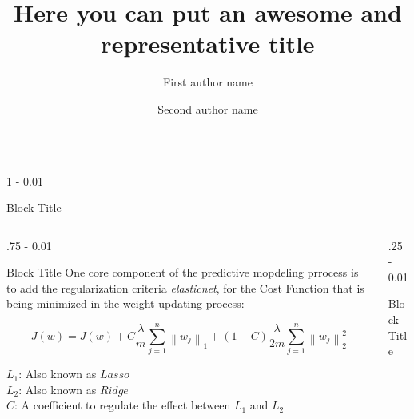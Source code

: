 \documentclass{postertheme}\usepackage[]{graphicx}\usepackage[]{color}
\title{Here you can put an awesome and representative title}
\author {
  First author name \inst{1}
  \and
  Second author name \inst{2}
  }
\institute {
  \inst{1} Academic institute
  \and
  \inst{2} Industry research center
  }
\begin{document}
\begin{frame}


\begin{columns}[onlytextwidth]
  
  \begin{column}{1 \textwidth - 0.01 \textwidth}
    \begin{block}{Block Title}
    
      \lipsum[1]
      
       
      
    \end{block}
  \end{column}
\end{columns}


\begin{columns}[onlytextwidth]
  
  \begin{column}{.75 \textwidth - 0.01 \textwidth}
    \begin{block}{Block Title}
      One core component of the predictive mopdeling prrocess is to add the regularization
      criteria \textit{elasticnet}, for the Cost Function that is being minimized in the
      weight updating process:

      \begin{equation}
          J(w) =  J(w) + C \frac{\lambda}{m} \sum_{j=1}^n \left \lVert w_j \right\rVert_1 + (1 - C) 
          \frac{\lambda}{2m} \sum_{j=1}^n \left \lVert w_j \right\rVert_2^2
      \end{equation}

      \footnotesize
      \noindent
      $L_{1}$: Also known as $Lasso$  \\
      $L_{2}$: Also known as $Ridge$ \\
      $C$: A coefficient to regulate the effect between $L_{1}$ and $L_{2}$

    \end{block}
  \end{column}

  \begin{column}{.25 \textwidth - 0.01 \textwidth}
    \begin{block}{Block Title}
      

\end{block}
\end{column}
\end{columns}
\end{frame}
\end{document}
